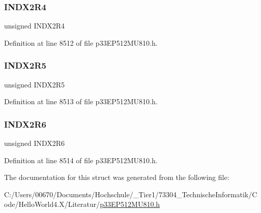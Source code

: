 \subsubsection{\texorpdfstring{I\+N\+D\+X2\+R4}{INDX2R4}}
{\footnotesize\ttfamily unsigned I\+N\+D\+X2\+R4}



Definition at line 8512 of file p33\+E\+P512\+M\+U810.\+h.

\mbox{\label{structtag_r_p_i_n_r17_b_i_t_s_a06018af6abae2f63eed086bae8a01040}} 
\subsubsection{\texorpdfstring{I\+N\+D\+X2\+R5}{INDX2R5}}
{\footnotesize\ttfamily unsigned I\+N\+D\+X2\+R5}



Definition at line 8513 of file p33\+E\+P512\+M\+U810.\+h.

\mbox{\label{structtag_r_p_i_n_r17_b_i_t_s_a2011773e36124b796571a625c6231ec8}} 
\subsubsection{\texorpdfstring{I\+N\+D\+X2\+R6}{INDX2R6}}
{\footnotesize\ttfamily unsigned I\+N\+D\+X2\+R6}



Definition at line 8514 of file p33\+E\+P512\+M\+U810.\+h.



The documentation for this struct was generated from the following file\+:\begin{DoxyCompactItemize}
\item 
C\+:/\+Users/00670/\+Documents/\+Hochschule/\+\_\+\+Tier1/73304\+\_\+\+Technische\+Informatik/\+Code/\+Hello\+World4.\+X/\+Literatur/\hyperlink{p33_e_p512_m_u810_8h}{p33\+E\+P512\+M\+U810.\+h}\end{DoxyCompactItemize}
